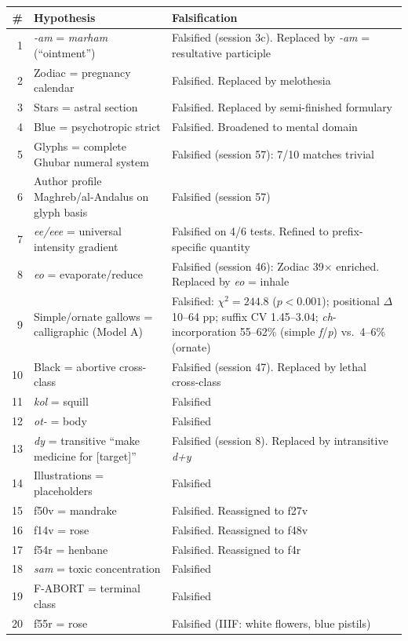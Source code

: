 \documentclass[11pt,a4paper]{article}
\begin{document}
\begin{longtable}{rp{5.5cm}p{6cm}}
\toprule
\# & Hypothesis & Falsification \\
\midrule
\endhead
1 & \textit{-am} = \textit{marham} (``ointment'') & Falsified (session 3c). Replaced by \textit{-am} = resultative participle \\
2 & Zodiac = pregnancy calendar & Falsified. Replaced by melothesia \\
3 & Stars = astral section & Falsified. Replaced by semi-finished formulary \\
4 & Blue = psychotropic strict & Falsified. Broadened to mental domain \\
5 & Glyphs = complete Ghubar numeral system & Falsified (session 57): 7/10 matches trivial \\
6 & Author profile Maghreb/al-Andalus on glyph basis & Falsified (session 57) \\
7 & \textit{ee/eee} = universal intensity gradient & Falsified on 4/6 tests. Refined to prefix-specific quantity \\
8 & \textit{eo} = evaporate/reduce & Falsified (session 46): Zodiac 39$\times$ enriched. Replaced by \textit{eo} = inhale \\
9 & Simple/ornate gallows = calligraphic (Model A) & Falsified: $\chi^2 = 244.8$ ($p < 0.001$); positional $\Delta$ 10--64 pp; suffix CV 1.45--3.04; \textit{ch}-incorporation 55--62\% (simple \textit{f}/\textit{p}) vs.\ 4--6\% (ornate) \\
10 & Black = abortive cross-class & Falsified (session 47). Replaced by lethal cross-class \\
11 & \textit{kol} = squill & Falsified \\
12 & \textit{ot-} = body & Falsified \\
13 & \textit{dy} = transitive ``make medicine for [target]'' & Falsified (session 8). Replaced by intransitive \textit{d+y} \\
14 & Illustrations = placeholders & Falsified \\
15 & f50v = mandrake & Falsified. Reassigned to f27v \\
16 & f14v = rose & Falsified. Reassigned to f48v \\
17 & f54r = henbane & Falsified. Reassigned to f4r \\
18 & \textit{sam} = toxic concentration & Falsified \\
19 & F-ABORT = terminal class & Falsified \\
20 & f55r = rose & Falsified (IIIF: white flowers, blue pistils) \\

\end{longtable}
\end{document}
